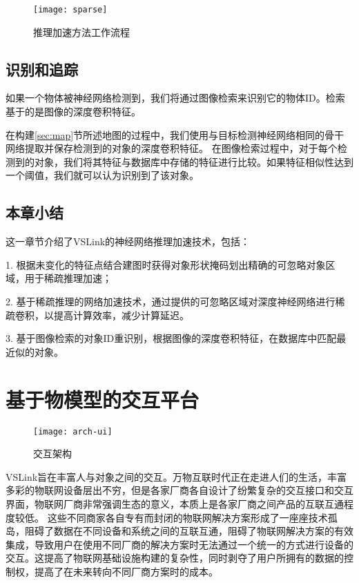 \begin{figure}[htbp]
	\centering
	\texttt{[image: sparse]}
	\caption{推理加速方法工作流程}
	\label{fig:sparse-conv}
\end{figure}

\section{识别和追踪}
如果一个物体被神经网络检测到，我们将通过图像检索来识别它的物体ID。检索基于的是图像的深度卷积特征。

在构建\ref{sec:map}节所述地图的过程中，我们使用与目标检测神经网络相同的骨干网络提取并保存检测到的对象的深度卷积特征。
在图像检索过程中，对于每个检测到的对象，我们将其特征与数据库中存储的特征进行比较。如果特征相似性达到一个阈值，我们就可以认为识别到了该对象。


\section{本章小结}
这一章节介绍了VSLink的神经网络推理加速技术，包括：

1. 根据未变化的特征点结合建图时获得对象形状掩码划出精确的可忽略对象区域，用于稀疏推理加速；

2. 基于稀疏推理的网络加速技术，通过提供的可忽略区域对深度神经网络进行稀疏卷积，以提高计算效率，减少计算延迟。

3. 基于图像检索的对象ID重识别，根据图像的深度卷积特征，在数据库中匹配最近似的对象。


\chapter{基于物模型的交互平台}
\label{chap:flexible}

\begin{figure}[htbp]
	\centering
	\texttt{[image: arch-ui]}
	\caption{交互架构}
	\label{fig:arch-ui}
\end{figure}

VSLink旨在丰富人与对象之间的交互。万物互联时代正在走进人们的生活，丰富多彩的物联网设备层出不穷，但是各家厂商各自设计了纷繁复杂的交互接口和交互界面，物联网厂商非常强调生态的意义，本质上是各家厂商之间产品的互联互通程度较低。
这些不同商家各自专有而封闭的物联网解决方案形成了一座座技术孤岛，阻碍了数据在不同设备和系统之间的互联互通，阻碍了物联网解决方案的有效集成，导致用户在使用不同厂商的解决方案时无法通过一个统一的方式进行设备的交互。这提高了物联网基础设施构建的复杂性，同时剥夺了用户所拥有的数据的控制权，提高了在未来转向不同厂商方案时的成本。

